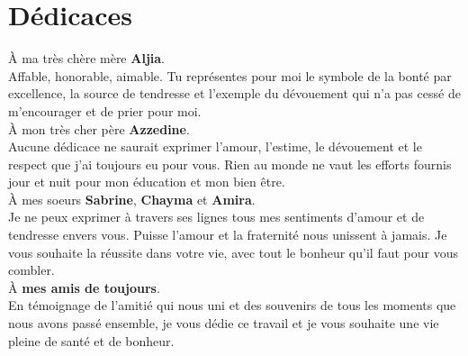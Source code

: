 \chapter*{\Huge Dédicaces}

À ma très chère mère {\Large \textbf{Aljia}}.\\
Affable, honorable, aimable. Tu représentes pour moi le symbole de la bonté par excellence, la source de tendresse et l’exemple du dévouement qui n’a pas cessé de m’encourager et de prier pour moi.\\ \newline
\tabto{1cm} À mon très cher père {\Large \textbf{Azzedine}}.\\
Aucune dédicace ne saurait exprimer l’amour, l’estime, le dévouement et le respect que j’ai toujours eu pour vous. Rien au monde ne vaut les efforts fournis jour et nuit pour mon éducation et mon bien être.\\ \newline
\tabto{1cm}À mes soeurs {\Large \textbf{Sabrine}}, {\Large \textbf{Chayma}} et {\Large \textbf{Amira}}.\\
Je ne peux exprimer à travers ses lignes tous mes sentiments d’amour et de tendresse envers vous. Puisse l’amour et la fraternité nous unissent à jamais. Je vous souhaite la réussite dans votre vie, avec tout le bonheur qu’il faut pour vous combler.\\ \newline
\tabto{1cm} À \textbf{{\Large mes amis de toujours}}.\\ 
En témoignage de l’amitié qui nous uni et des souvenirs de tous les moments que nous avons passé ensemble, je vous dédie ce travail et je vous souhaite une vie pleine de santé et de bonheur.\\

\vspace{8mm}
\begin{flushright}
    \LARGE \@author
\end{flushright}